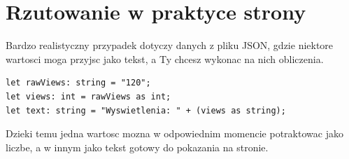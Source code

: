 \section{Rzutowanie w praktyce strony}
Bardzo realistyczny przypadek dotyczy danych z pliku JSON, gdzie niektore wartosci moga
przyjsc jako tekst, a Ty chcesz wykonac na nich obliczenia.

\begin{lstlisting}[style=moonchunk,caption={Konwersja danych zewnetrznych}]
let rawViews: string = "120";
let views: int = rawViews as int;
let text: string = "Wyswietlenia: " + (views as string);
\end{lstlisting}

Dzieki temu jedna wartosc mozna w odpowiednim momencie potraktowac jako liczbe,
a w innym jako tekst gotowy do pokazania na stronie.
